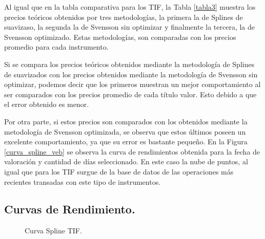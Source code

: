 \newpage

\hspace{0.4cm} Al igual que en la tabla comparativa para los TIF, la Tabla \ref{tabla3} muestra los precios te\'oricos obtenidos por tres metodolog\'ias, la primera la de Splines de suavizaso, la segunda la de Svensson sin optimizar y finalmente la tercera, la de Svensson optimizado. Estas metodolog\'ias, son comparadas con los precios promedio para cada instrumento.

\hspace{0.4cm} Si se compara los precios te\'oricos obtenidos mediante la metodolog\'ia de Splines de suavizados con los precios obtenidos mediante la metodolog\'ia de Svensson sin optimizar, podemos decir que los primeros muestran un mejor comportamiento al ser comparados con los precios promedio de cada t\'itulo valor. Esto debido a que el error obtenido es menor.

\hspace{0.4cm}Por otra parte, si estos precios son comparados con los obtenidos mediante la metodolog\'ia de Svensson optimizada, se observa que estos \'ultimos poseen un excelente comportamiento, ya que su error es bastante peque\~no. En la Figura \ref{curva_spline_veb} se observa la curva de rendimientos obtenida para la fecha de valoraci\'on y cantidad de d\'ias seleccionado. En este caso la nube de puntos, al igual que para los TIF surgue de la base de datos de las operaciones m\'as recientes transadas con este tipo de instrumentos.

\subsection{Curvas de Rendimiento.} \hspace{5cm}


\begin{figure}[h]
\caption{Curva Spline TIF.}
\label{curva_spline_tif}
\end{figure}



